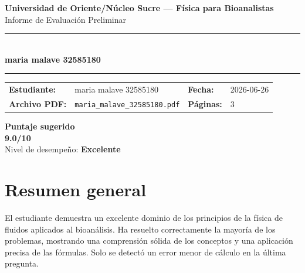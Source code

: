 \documentclass[11pt,a4paper]{article}
\begin{document}
\begin{center}
  {\Large\bfseries\color{azulTitulo} Universidad de Oriente/Núcleo Sucre --- Física para Bioanalistas}\\[4pt]
  {\large Informe de Evaluación Preliminar}\\[12pt]
  \rule{\linewidth}{1.2pt}\\[6pt]
  {\LARGE\bfseries maria malave 32585180}\\[4pt]
  \rule{\linewidth}{0.6pt}
\end{center}

\vspace{4pt}
\begin{tcolorbox}[cajaTitulo, title=Datos del informe]
\begin{tabular}{@{}llll@{}}
  \textbf{Estudiante:}  & maria malave 32585180  &
  \textbf{Fecha:}       & 2026-06-26 \\[4pt]
  \textbf{Archivo PDF:} & \texttt{maria\_malave\_32585180.pdf}  &
  \textbf{Páginas:}     & 3 \\
\end{tabular}
\end{tcolorbox}

\vspace{6pt}
\begin{center}
  \begin{tcolorbox}[
    enhanced,
    colback=white, colframe=desempeno_excelente,
    width=0.62\linewidth,
    boxrule=2pt,
    halign=center, valign=center,
    top=8pt, bottom=8pt,
  ]
    \centering
    {\large\bfseries Puntaje sugerido}\\[6pt]
    {\Huge\bfseries\color{desempeno_excelente} 9.0/10}\\[6pt]
    {\large Nivel de desempeño: \textbf{\color{desempeno_excelente} Excelente}}
  \end{tcolorbox}
\end{center}

\section*{Resumen general}
El estudiante demuestra un excelente dominio de los principios de la física de fluidos aplicados al bioanálisis. Ha resuelto correctamente la mayoría de los problemas, mostrando una comprensión sólida de los conceptos y una aplicación precisa de las fórmulas. Solo se detectó un error menor de cálculo en la última pregunta.
\end{document}
